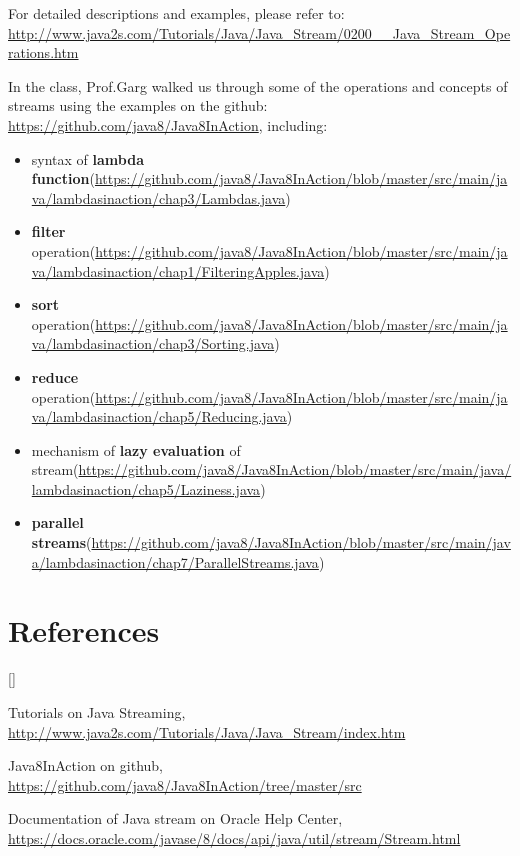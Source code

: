 \documentclass[twoside]{article}
\def\beginrefs{\begin{list}%
        {[\arabic{equation}]}{\usecounter{equation}
         \setlength{\leftmargin}{2.0truecm}\setlength{\labelsep}{0.4truecm}%
         \setlength{\labelwidth}{1.6truecm}}}
\def\endrefs{\end{list}}
\def\bibentry#1{\item[\hbox{[#1]}]}
\begin{document}
For detailed descriptions and examples,  please refer to: \url{http://www.java2s.com/Tutorials/Java/Java_Stream/0200__Java_Stream_Operations.htm}

In the class, Prof.Garg walked us through some of the operations and concepts of streams using the examples on the github: \url{https://github.com/java8/Java8InAction}, including:\\
\begin{itemize}
\item syntax of \textbf{lambda function}(\url{https://github.com/java8/Java8InAction/blob/master/src/main/java/lambdasinaction/chap3/Lambdas.java})
\item \textbf{filter} operation(\url{https://github.com/java8/Java8InAction/blob/master/src/main/java/lambdasinaction/chap1/FilteringApples.java})
\item \textbf{sort} operation(\url{https://github.com/java8/Java8InAction/blob/master/src/main/java/lambdasinaction/chap3/Sorting.java})
\item \textbf{reduce} operation(\url{https://github.com/java8/Java8InAction/blob/master/src/main/java/lambdasinaction/chap5/Reducing.java}) 
\item mechanism of \textbf{lazy evaluation} of stream(\url{https://github.com/java8/Java8InAction/blob/master/src/main/java/lambdasinaction/chap5/Laziness.java})
\item \textbf{parallel streams}(\url{https://github.com/java8/Java8InAction/blob/master/src/main/java/lambdasinaction/chap7/ParallelStreams.java})
\end{itemize} 

 



\section*{References}
\beginrefs
\bibentry{1}{\sc Tutorials on Java Streaming},
\url{http://www.java2s.com/Tutorials/Java/Java_Stream/index.htm}
\bibentry{2}{\sc Java8InAction on github},
\url{https://github.com/java8/Java8InAction/tree/master/src}
\bibentry{3}{\sc Documentation of Java stream on Oracle Help Center},
\url{https://docs.oracle.com/javase/8/docs/api/java/util/stream/Stream.html}
\endrefs
\end{document}
